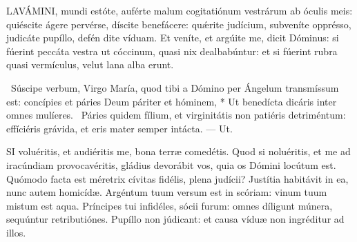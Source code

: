 \sectionornament


\textit{}






\sectionornament




\lettrine[lines=2]{L}{AVÁMINI}, mundi estóte, auférte malum cogitatiónum vestrárum ab óculis meis: quiéscite ágere pervérse, díscite benefácere: quǽrite judícium, subveníte opprésso, judicáte pupíllo, defén dite víduam. Et veníte, et argúite me, dicit Dóminus: si fúerint peccáta vestra ut cóccinum, quasi nix dealbabúntur: et si fúerint rubra quasi vermículus, velut lana alba erunt.

\R\ Súscipe verbum, Virgo María, quod tibi a Dómino per Ángelum transmíssum est: concípies et páries Deum páriter et hóminem, * Ut benedícta dicáris inter omnes mulíeres. \V\ Páries quidem fílium, et virginitátis non patiéris detriméntum: effíciéris grávida, et eris mater semper intácta. --- Ut.


\lettrine[lines=2]{S}{I} voluéritis, et audiéritis me, bona terræ comedétis. Quod si noluéritis, et me ad iracúndiam provocavéritis, gládius devorábit vos, quia os Dómini locútum est. Quómodo facta est méretrix cívitas fidélis, plena judícii? Justítia habitávit in ea, nunc autem homicídæ. Argéntum tuum versum est in scóriam: vinum tuum mistum est aqua. Príncipes tui infidéles, sócii furum: omnes díligunt múnera, sequúntur retributiónes. Pupíllo non júdicant: et causa víduæ non ingréditur ad illos.

